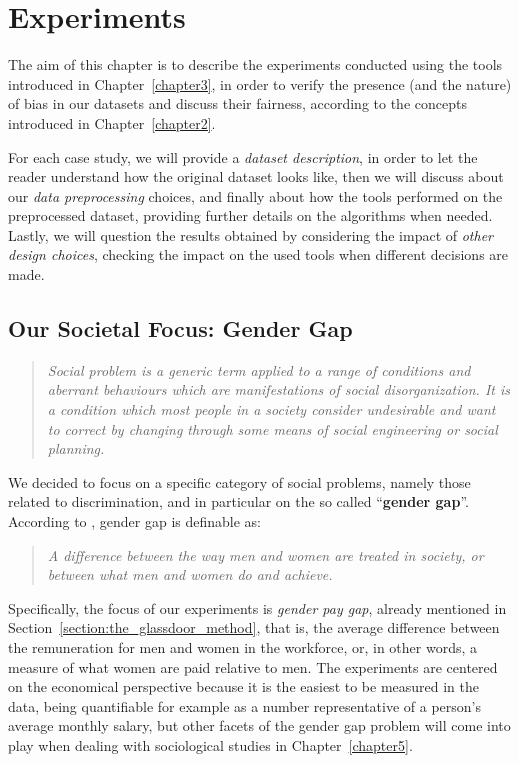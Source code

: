 \chapter{Experiments}
\label{chapter4}
\thispagestyle{empty}

The aim of this chapter is to describe the experiments conducted using the tools introduced in Chapter~\ref{chapter3}, in order to verify the presence (and the nature) of bias in our datasets and discuss their fairness, according to the concepts introduced in Chapter~\ref{chapter2}.

For each case study, we will provide a \textit{dataset description}, in order to let the reader understand how the original dataset looks like, then we will discuss about our \textit{data preprocessing} choices, and finally about how the tools performed on the preprocessed dataset, providing further details on the algorithms when needed. Lastly, we will question the results obtained by considering the impact of \textit{other design choices}, checking the impact on the used tools when different decisions are made.


\section{Our Societal Focus: Gender Gap}
\begin{quote}\emph{Social problem is a generic term applied to a range of conditions and aberrant behaviours which are manifestations of social disorganization. It is a condition which most people in a society consider undesirable and want to correct by changing through some means of social engineering or social planning.} \cite{scott2009dictionary}\end{quote}
We decided to focus on a specific category of social problems, namely those related to discrimination, and in particular on the so called ``\textbf{gender gap}''. According to \cite{cambridge2013gender}, gender gap is definable as:
\begin{quote}\emph{A difference between the way men and women are treated in society, or between what men and women do and achieve.} \cite{cambridge2013gender}\end{quote}
Specifically, the focus of our experiments is \textit{gender pay gap}, already mentioned in Section~\ref{section:the_glassdoor_method}, that is, the average difference between the remuneration for men and women in the workforce, or, in other words, a measure of what women are paid relative to men. The experiments are centered on the economical perspective because it is the easiest to be measured in the data, being quantifiable for example as a number representative of a person's average monthly salary, but other facets of the gender gap problem will come into play when dealing with sociological studies in Chapter~\ref{chapter5}.


